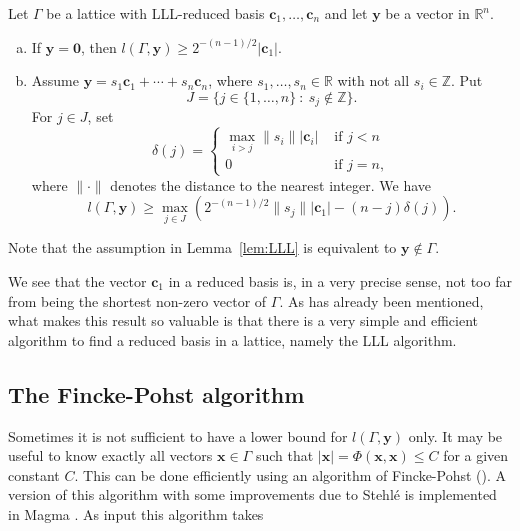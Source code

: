 \begin{lemma} \label{lem:LLL}
Let $\Gamma$ be a lattice with LLL-reduced basis $\mathbf{c}_1, \dots, \mathbf{c}_n$ and let $\mathbf{y}$ be a vector in $\mathbb{R}^n$. 
\begin{enumerate}[(a)]
\item If $\mathbf{y} = \mathbf{0}$, then $l(\Gamma,\mathbf{y}) \geq 2^{-(n-1)/2}|\mathbf{c}_1|$.
\item Assume $\mathbf{y} = s_1\mathbf{c}_1 + \cdots + s_n \mathbf{c}_n$, where $s_1, \dots, s_n \in \mathbb{R}$ with not all $s_i \in \mathbb{Z}$. Put 
\[J = \{j \in \{1, \dots, n\} \ : \ s_j \notin \mathbb{Z} \}.\]
For $j \in J$, set 
\[\delta(j) = 
\begin{cases}
\max_{i > j} \|s_i \| |\mathbf{c}_i| 	& \text{ if } j < n\\
0 							& \text{ if } j = n,
\end{cases}\]
where $\| \cdot \|$ denotes the distance to the nearest integer. We have
\[l(\Gamma,\mathbf{y}) \geq \max_{j \in J}\left(2^{-(n-1)/2}\| s_j\| |\mathbf{c}_1| - (n-j)\delta(j)\right).\]
\end{enumerate}
\end{lemma}
Note that the assumption in Lemma~\ref{lem:LLL} is equivalent to ${\mathbf{y} \notin \Gamma}$. 

We see that the vector $\mathbf{c}_1$ in a reduced basis is, in a very precise sense, not too far from being the shortest non-zero vector of $\Gamma$. As has already been mentioned, what makes this result so valuable is that there is a very simple and efficient algorithm to find a reduced basis in a lattice, namely the LLL algorithm.


\subsection{The Fincke-Pohst algorithm}
\label{subsec:FinckePohst}

Sometimes it is not sufficient to have a lower bound for $l(\Gamma,\mathbf{y})$ only. It may be useful to know exactly all vectors $\mathbf{x} \in \Gamma$ such that $|\mathbf{x}|  = \Phi(\mathbf{x}, \mathbf{x}) \leq C$ for a given constant $C$. This can be done efficiently using an algorithm of Fincke-Pohst (). A version of this algorithm with some improvements due to Stehl\'e is implemented in Magma . As input this algorithm takes 



